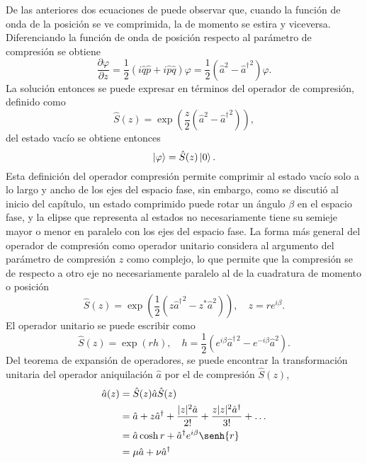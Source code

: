 De las anteriores dos ecuaciones de puede observar que, cuando la función de onda de la posición se ve comprimida, la de momento se estira y viceversa. Diferenciando la función de onda de posición respecto al parámetro de compresión se obtiene \cite{Leonhardt}
\begin{equation}
  \frac{\partial \varphi}{\partial z} = \frac{1}{2}\left( i\hat{q}\hat{p} + i\hat{p}\hat{q} \right)\varphi = \frac{1}{2}\left( {\hat{a}}^2 - {\hat{a}^{\dagger}}^2 \right)\varphi.
\end{equation}
La solución entonces se puede expresar en términos del operador de compresión, definido como
\begin{equation}
  \hat{S}(z) = \exp{\left( \frac{z}{2}(\hat{a}^2 - {\hat{a}^{\dagger}}^2) \right)},
\end{equation}
del estado vacío se obtiene entonces
\begin{equation}
  \ket{\varphi} = \hat{S}(z)\ket{0}.
\end{equation}
Esta definición del operador compresión permite comprimir al estado vacío solo a lo largo y ancho de los ejes del espacio fase, sin embargo, como se discutió al inicio del capítulo, un estado comprimido puede rotar un ángulo $\beta$ en el espacio fase, y la elipse que representa al estados no necesariamente tiene su semieje mayor o menor en paralelo con los ejes del espacio fase. La forma más general del operador de compresión como operador unitario considera al argumento del parámetro de compresión $z$ como complejo, lo que permite que la compresión se de respecto a otro eje no necesariamente paralelo al de la cuadratura de momento o posición \cite{Loudon}
\begin{equation}\label{eq:squeeze-op}
  \hat{S}(z) = \exp{\left( \frac{1}{2} (z{\hat{a}^{\dagger}}^2 - z^* {\hat{a}}^2) \right)}, \quad z = re^{i\beta}.
\end{equation}
El operador unitario se puede escribir como
\begin{equation}
  \hat{S}(z) = \exp(rh), \quad h = \frac{1}{2}\left( e^{i\beta}\hat{a}^{\dagger\,2} - e^{-i\beta}\hat{a}^{2} \right).
\end{equation}
Del teorema de expansión de operadores, se puede encontrar la transformación unitaria del operador aniquilación $\hat{a}$ por el de compresión $\hat{S}(z)$,
\begin{align}
  \hat{a}(z) & = \hat{S}(z)\hat{a} \hat{S}(z)                                                                       \nonumber \\
             & = \hat{a}  + z\hat{a}^{\dagger} + \frac{|z|^2\hat{a}}{2!} + \frac{z|z|^2\hat{a}^{\dagger}}{3!}+\dots \nonumber \\
             & = \hat{a} \cosh{r} + \hat{a}^{\dagger} e^{i\beta}\senh{r}                                            \nonumber \\
             & = \mu\hat{a} + \nu\hat{a}^{\dagger} \label{eq:squeezed_a}
\end{align}
